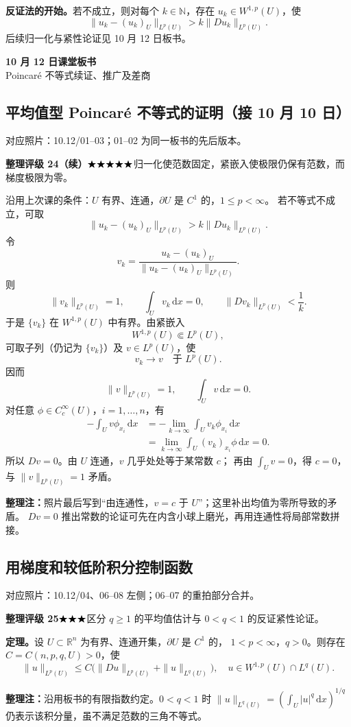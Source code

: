 \documentclass[UTF8,a4paper,11pt,fontset=fandol]{ctexart}
\newcommand{\R}{\mathbb R}
\newcommand{\N}{\mathbb N}
\newcommand{\dd}{\,\mathrm d}
\newcommand{\ednote}[1]{\par{\small\color{notegray}\textbf{整理注：}#1}\par}
\newcommand{\source}[1]{{\small\color{notegray}对应照片：#1。}\par}
\newcommand{\proofstars}[1]{\ensuremath{%
\ifnum#1>0\relax\bigstar\fi
\ifnum#1>1\relax\bigstar\fi
\ifnum#1>2\relax\bigstar\fi
\ifnum#1>3\relax\bigstar\fi
\ifnum#1>4\relax\bigstar\fi}}
\newcommand{\proofrating}[3]{\par{\small\color{proofblue}%
\textbf{整理评级 #1}\enspace\proofstars{#2}\quad #3\par}}
\begin{document}
\textbf{反证法的开始。}若不成立，则对每个 $k\in\N$，存在 $u_k\in W^{1,p}(U)$，使
\[
\|u_k-(u_k)_U\|_{L^p(U)}>k\|Du_k\|_{L^p(U)}.
\]
后续归一化与紧性论证见 10 月 12 日板书。

\newpage
{}
\begin{center}
{\LARGE\bfseries 10 月 12 日课堂板书}\\[5pt]
{Poincaré 不等式续证、推广及差商}
\end{center}

\subsection*{平均值型 Poincaré 不等式的证明（接 10 月 10 日）}
\source{10.12/01--03；01--02 为同一板书的先后版本}
\proofrating{24（续）}{5}{归一化使范数固定，紧嵌入使极限仍保有范数，而梯度极限为零。}
沿用上次课的条件：$U$ 有界、连通，$\partial U$ 是 $C^1$ 的，$1\leq p<\infty$。
若不等式不成立，可取
\[
\|u_k-(u_k)_U\|_{L^p(U)}>k\|Du_k\|_{L^p(U)}.
\]
令
\[
v_k=\frac{u_k-(u_k)_U}{\|u_k-(u_k)_U\|_{L^p(U)}}.
\]
则
\[
\|v_k\|_{L^p(U)}=1,\qquad
\int_Uv_k\dd x=0,\qquad
\|Dv_k\|_{L^p(U)}<\frac1k.
\]
于是 $\{v_k\}$ 在 $W^{1,p}(U)$ 中有界。由紧嵌入
\[
W^{1,p}(U)\Subset L^p(U),
\]
可取子列（仍记为 $\{v_k\}$）及 $v\in L^p(U)$，使
\[
v_k\longrightarrow v\quad\text{于 }L^p(U).
\]
因而
\[
\|v\|_{L^p(U)}=1,\qquad\int_Uv\dd x=0.
\]
对任意 $\phi\in C_c^\infty(U)$，$i=1,\ldots,n$，有
\[
\begin{aligned}
-\int_Uv\phi_{x_i}\dd x
&=-\lim_{k\to\infty}\int_Uv_k\phi_{x_i}\dd x\\
&=\lim_{k\to\infty}\int_U(v_k)_{x_i}\phi\dd x=0.
\end{aligned}
\]
所以 $Dv=0$。由 $U$ 连通，$v$ 几乎处处等于某常数 $c$；
再由 $\int_Uv=0$，得 $c=0$，与 $\|v\|_{L^p(U)}=1$ 矛盾。
\ednote{照片最后写到“由连通性，$v=c$ 于 $U$”；这里补出均值为零所导致的矛盾。
$Dv=0$ 推出常数的论证可先在内含小球上磨光，再用连通性将局部常数拼接。}

\newpage
\subsection{用梯度和较低阶积分控制函数}
\source{10.12/04、06--08 左侧；06--07 的重拍部分合并}
\proofrating{25}{3}{区分 $q\geq1$ 的平均值估计与 $0<q<1$ 的反证紧性论证。}
\textbf{定理。}设 $U\subset\R^n$ 为有界、连通开集，$\partial U$ 是 $C^1$ 的，
$1<p<\infty$，$q>0$。则存在 $C=C(n,p,q,U)>0$，使
\[
\boxed{\|u\|_{L^p(U)}\leq C\bigl(\|Du\|_{L^p(U)}+\|u\|_{L^q(U)}\bigr),
\quad u\in W^{1,p}(U)\cap L^q(U).}
\]
\ednote{沿用板书的有限指数约定。$0<q<1$ 时
$\|u\|_{L^q(U)}=(\int_U|u|^q\dd x)^{1/q}$ 仍表示该积分量，虽不满足范数的三角不等式。}
\end{document}
